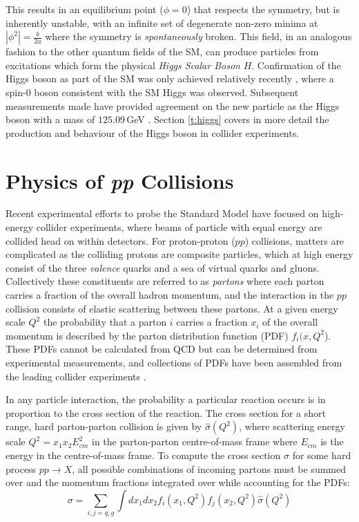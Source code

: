	This results in an equilibrium point ($\phi=0$) that respects the symmetry, but is inherently unstable, with an infinite set of degenerate non-zero minima at $|\phi^2|=\frac{b}{2a}$ where the symmetry is \textit{spontaneously} broken. This field, in an analogous fashion to the other quantum fields of the SM, can produce particles from excitations which form the physical \textit{Higgs Scalar Boson} $H$. Confirmation of the Higgs boson as part of the SM was only achieved relatively recently \cite{higgs-atlas, higgs-cms}, where a spin-$0$ boson consistent with the SM Higgs was observed. Subsequent measurements made have provided agreement on the new particle as the Higgs boson with a mass of $125.09$\,GeV \cite{pdg}. Section \ref{t:higgs} covers in more detail the production and behaviour of the Higgs boson in collider experiments.


\section{Physics of \textit{pp} Collisions}

	Recent experimental efforts to probe the Standard Model have focused on high-energy collider experiments, where beams of particle with equal energy are collided head on within detectors.  For proton-proton ($pp$) collisions, matters are complicated as the colliding protons are composite particles, which at high energy consist of the three \textit{valence} quarks and a sea of virtual quarks and gluons. Collectively these constituents are referred to as \textit{partons} where each parton carries a fraction of the overall hadron momentum, and the interaction in the $pp$ collision consists of elastic scattering between these partons. At a given energy scale $Q^2$ the probability that a parton $i$ carries a fraction $x_i$ of the overall momentum is described by the parton distribution function (PDF) $f_i(x, Q^2$). These PDFs cannot be calculated from QCD but can be determined from experimental measurements, and collections of PDFs have been assembled from the leading collider experiments \cite{pdfs}.

	In any particle interaction, the probability a particular reaction occurs is in proportion to the cross section of the reaction. The cross section for a short range, hard parton-parton collision is given by $\hat{\sigma}(Q^2)$, where scattering energy scale $Q^2 = x_1x_2E^2_{cm}$ in the parton-parton centre-of-mass frame where $E_{cm}$ is the energy in the centre-of-mass frame. To compute the cross section $\sigma$ for some hard process $pp\rightarrow X$, all possible combinations of incoming partons must be summed over and the momentum fractions integrated over while accounting for the PDFs:
	\begin{equation}
	\sigma = \sum_{i, j = q, g} \int dx_1dx_2f_i(x_1, Q^2)f_j(x_2, Q^2)\hat{\sigma}(Q^2)
	\end{equation}

